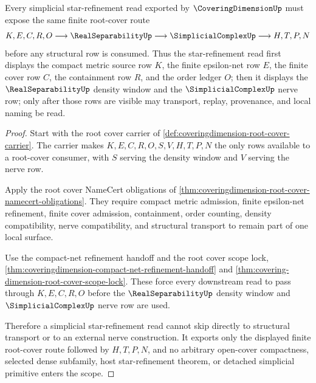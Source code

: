 \begin{theorem}
\label{thm:covering-dimension-simplicial-star-refinement-scope}
Every simplicial star-refinement read exported by $\CoveringDimensionUp$ must expose the same finite root-cover route
$$
K,E,C,R,O
\longrightarrow
\RealSeparabilityUp
\longrightarrow
\SimplicialComplexUp
\longrightarrow
H,T,P,N
$$
before any structural row is consumed. Thus the star-refinement read first displays the compact metric source row $K$, the finite epsilon-net row $E$, the finite cover row $C$, the containment row $R$, and the order ledger $O$; then it displays the $\RealSeparabilityUp$ density window and the $\SimplicialComplexUp$ nerve row; only after those rows are visible may transport, replay, provenance, and local naming be read.
\end{theorem}
\begin{proof}
Start with the root cover carrier of \autoref{def:coveringdimension-root-cover-carrier}. The carrier makes $K,E,C,R,O,S,V,H,T,P,N$ the only rows available to a root-cover consumer, with $S$ serving the density window and $V$ serving the nerve row.

Apply the root cover NameCert obligations of \autoref{thm:coveringdimension-root-cover-namecert-obligations}. They require compact metric admission, finite epsilon-net refinement, finite cover admission, containment, order counting, density compatibility, nerve compatibility, and structural transport to remain part of one local surface.

Use the compact-net refinement handoff and the root cover scope lock, \autoref{thm:coveringdimension-compact-net-refinement-handoff} and \autoref{thm:covering-dimension-root-cover-scope-lock}. These force every downstream read to pass through $K,E,C,R,O$ before the $\RealSeparabilityUp$ density window and $\SimplicialComplexUp$ nerve row are used.

Therefore a simplicial star-refinement read cannot skip directly to structural transport or to an external nerve construction. It exports only the displayed finite root-cover route followed by $H,T,P,N$, and no arbitrary open-cover compactness, selected dense subfamily, host star-refinement theorem, or detached simplicial primitive enters the scope.
\end{proof}

